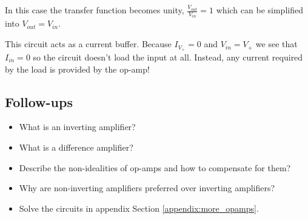 \documentclass[main.tex]{subfiles}
\begin{document}
\noindent In this case the transfer function becomes unity, $\frac{V_{out}}{V_{in}} = 1$ which can be simplified into $V_{out} = V_{in}$. \newline

\newnoindentpara This circuit acts as a current buffer. Because $I_{V_{+}} = 0$ and $V_{in} = V_{+}$ we see that $I_{in} = 0$ so the circuit doesn't load the input at all. Instead, any current required by the load is provided by the op-amp! 





\subsection{Follow-ups}
\begin{itemize}
    \item What is an inverting amplifier?
    \item What is a difference amplifier?
    \item Describe the non-idealities of op-amps and how to compensate for them? %
    \item Why are non-inverting amplifiers preferred over inverting amplifiers? %
    \item Solve the circuits in appendix Section \ref{appendix:more_opamps}. 
\end{itemize}
\end{document}
